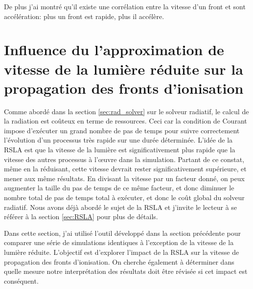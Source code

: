 De plus j'ai montré qu'il existe une corrélation entre la vitesse d'un front et sont accélération: plus un front est rapide, plus il accélère.



\chapter{Influence du l'approximation de vitesse de la lumière réduite sur la propagation des fronts d'ionisation}
\label{sec:lightspeed}



Comme abordé dans la section \ref{sec:rad_solver} sur le solveur radiatif, le calcul de la radiation est coûteux en terme de ressources.
Ceci car la condition de Courant impose d'exécuter un grand nombre de pas de temps pour suivre correctement l'évolution d'un processus très rapide sur une durée déterminée.
L'idée de la \ac{RSLA} est que la vitesse de la lumière est significativement plus rapide que la vitesse des autres processus à l’œuvre dans la simulation.
Partant de ce constat, même en la réduisant, cette vitesse devrait rester significativement supérieure, et mener aux même résultats.
En divisant la vitesse par un facteur donné, on peux augmenter la taille du pas de temps de ce même facteur, et donc diminuer le nombre total de pas de temps total à exécuter, et donc le coût global du solveur radiatif.
Nous avons déjà abordé le sujet de la \ac{RSLA} et j'invite le lecteur à se référer à la section \ref{sec:RSLA} pour plus de détails.

Dans cette section, j'ai utilisé l'outil développé dans la section précédente pour comparer une série de simulations identiques à l'exception de la vitesse de la lumière réduite.
L'objectif est d'explorer l'impact de la \ac{RSLA} sur la vitesse de propagation des fronts d'ionisation.
On cherche également à déterminer dans quelle mesure notre interprétation des résultats doit être révisée si cet impact est conséquent.

